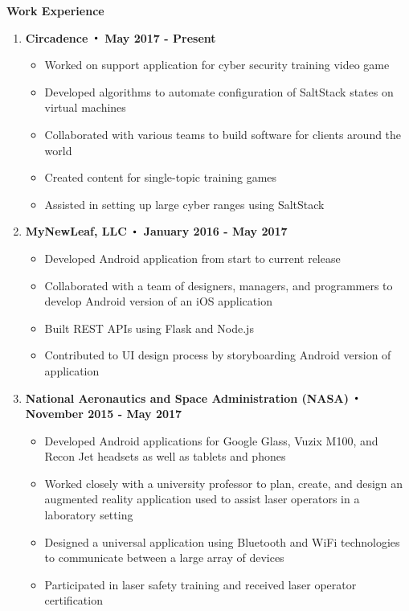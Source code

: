 \noindent\textbf{\large Work Experience}
\begin{enumerate}[label={\Roman*}.]
	\item \textbf{Circadence $\Bigcdot$ May 2017 - Present}
		\begin{itemize}
			\item Worked on support application for cyber security training video game
			\item Developed algorithms to automate configuration of SaltStack states on virtual machines
			\item Collaborated with various teams to build software for clients around the world
			\item Created content for single-topic training games
			\item Assisted in setting up large cyber ranges using SaltStack
		\end{itemize}
	\item \textbf{MyNewLeaf, LLC $\Bigcdot$ January 2016 - May 2017}
	      \begin{itemize}
	      	\item Developed Android application from start to current release
	      	\item Collaborated with a team of designers, managers, and programmers to develop Android version of an iOS application
	      	\item Built REST APIs using Flask and Node.js
	      	\item Contributed to UI design process by storyboarding Android version of application
	      \end{itemize}

	\item \textbf{National Aeronautics and Space Administration (NASA) $\Bigcdot$ November 2015 - May 2017}
	      \begin{itemize}
	      	\item Developed Android applications for Google Glass, Vuzix M100, and Recon Jet headsets as well as tablets and phones
	      	\item Worked closely with a university professor to plan, create, and design an augmented reality application used to assist laser operators in a laboratory setting
	      	\item Designed a universal application using Bluetooth and WiFi technologies to communicate between a large array of devices
	      	\item Participated in laser safety training and received laser operator certification
	      \end{itemize}


\end{enumerate}
